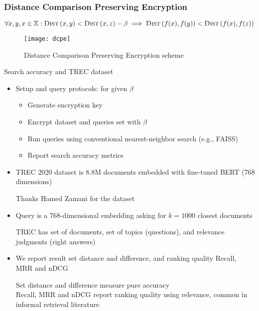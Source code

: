 	\begin{frame}[label={frame:dcpe}]

		\frametitle{Distance Comparison Preserving Encryption}

		\[
			\forall x, y, x \in \mathbb{X} : \algo{Dist}{x, y} < \algo{Dist}{x, z} - \beta \implies \algo{Dist}{f(x), f(y)} < \algo{Dist}{f(x), f(z)}
		\]

		\begin{figure}[h]
			\centering
			\texttt{[image: dcpe]}
			\caption{
				Distance Comparison Preserving Encryption scheme \cite{dcpe} \\
				\hyperlink{frame:appendix:dcpe}{}
			}%
		\end{figure}

	\end{frame}

	\begin{frame}{Search accuracy and TREC dataset}

		\begin{itemize}
			\item<1->
				Setup and query protocols: for given $\beta$
				\begin{itemize}
					\item Generate encryption key
					\item Encrypt dataset and queries set with $\beta$
					\item Run queries using conventional nearest-neighbor search (e.g., FAISS)
					\item Report search accuracy metrics
				\end{itemize}

			\item<2->
				TREC 2020 dataset is 8.8M documents embedded with fine-tuned BERT (768 dimensions) \\
				\begin{small}
					\indent{} Thanks Hamed Zamani for the dataset
				\end{small}

			\item<3->
				Query is a 768-dimensional embedding asking for $k = \num{1000}$ closest documents \\
				\begin{small}
					\indent{} TREC has set of documents, set of topics (questions), and relevance judgments (right answers)
				\end{small}

			\item<4->
				We report result set distance and difference, and ranking quality Recall, MRR and nDCG \\
				\begin{small}
					\indent{} Set distance and difference measure pure \knn{} accuracy \\
					\indent{} Recall, MRR and nDCG report ranking quality using relevance, common in informal retrieval literature
				\end{small}

		\end{itemize}

	\end{frame}

